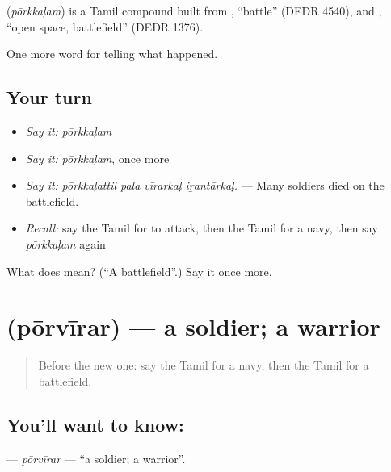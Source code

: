 \begin{cousinweb}
\textbf{} (\emph{pōrkkaḷam}) is a Tamil compound built from , \textquotedblleft{}battle\textquotedblright{} (DEDR 4540), and , \textquotedblleft{}open space, battlefield\textquotedblright{} (DEDR 1376).
\end{cousinweb}

\begin{grammarlens}[title={What you've built}]
One more word for telling what happened.
\end{grammarlens}

\subsection*{Your turn}
\begin{itemize}
\raggedright
  \item \emph{Say it:} \emph{pōrkkaḷam}
  \item \emph{Say it:} \emph{pōrkkaḷam}, once more
  \item \emph{Say it:} \emph{pōrkkaḷattil pala vīrarkaḷ iṟantārkaḷ.} — Many soldiers died on the battlefield.
  \item \emph{Recall:} say the Tamil for to attack, then the Tamil for a navy, then say \emph{pōrkkaḷam} again
\end{itemize}

\begin{tcolorbox}[breakable,colback=teal!4,colframe=teal!35!black,title={Before you move on}]
What does  mean? (\textquotedblleft{}A battlefield\textquotedblright{}.) Say it once more.
\end{tcolorbox}
\section[\texorpdfstring{\ta{போர்வீரர்} (pōrvīrar)}{போர்வீரர் (pōrvīrar)}]{ (pōrvīrar) — a soldier; a warrior}

\label{lesson:TA-C333-porvirar}



\begin{quote}
Before the new one: say the Tamil for a navy, then the Tamil for a battlefield.
\end{quote}

\subsection*{You'll want to know: }
\textbf{} — \emph{pōrvīrar} — \textquotedblleft{}a soldier; a warrior\textquotedblright{}.

